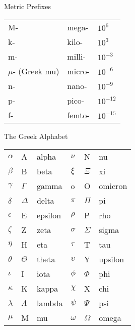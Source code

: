 \begin{datatablepage}\label{datatable}


\begin{datatable}{Metric Prefixes}
\noindent\begin{tabular}{lll}
M-	& mega-			& $10^6$ \\
k-	& kilo-			& $10^3$ \\
m-	& milli-		& $10^{-3}$ \\
$\mu$- (Greek mu) & micro-	& $10^{-6}$ \\
n-	& nano-			& $10^{-9}$ \\
p-	& pico-			& $10^{-12}$ \\
f-	& femto-		& $10^{-15}$
\end{tabular}

\noindent{}
\end{datatable}

\vspace{2.5mm}


\begin{datatable}{The Greek Alphabet}
\noindent\begin{tabular}{lll|lll}
$\alpha$	& A			& alpha	  & $\nu$	& N		& nu \\
$\beta$		& B			& beta    & $\xi$		& $\Xi$		& xi \\
$\gamma$	& $\Gamma$	        & gamma	  & o	& O		& omicron \\
$\delta$	& $\Delta$		& delta	  & $\pi$		& $\Pi$		& pi \\
$\epsilon$	& E			& epsilon &  $\rho$	& P		& rho \\
$\zeta$		& Z			& zeta	  & $\sigma$	& $\Sigma$	& sigma \\
$\eta$		& H			& eta	  & $\tau$ & T & tau\\
$\theta$	& $\Theta$		& theta	  & $\upsilon$ & Y & upsilon \\
$\iota$		& I		        & iota    & $\phi$ & $\Phi$ & phi\\
$\kappa$	& K	                & kappa   & $\chi$ & X & chi\\
$\lambda$       & $\Lambda$             & lambda  & $\psi$ & $\Psi$ & psi\\
$\mu$	        & M                     & mu      & $\omega$ & $\Omega$ & omega
\end{tabular}
\end{datatable}


\end{datatablepage}

